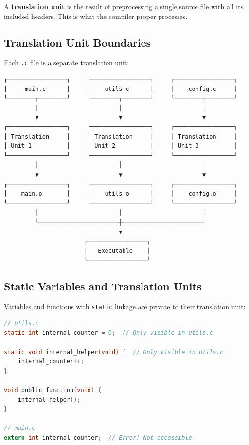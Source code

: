 A \textbf{translation unit} is the result of preprocessing a single source file with all its included headers. This is what the compiler proper processes.

\subsection{Translation Unit Boundaries}

Each \texttt{.c} file is a separate translation unit:

\begin{verbatim}
┌─────────────────┐     ┌─────────────────┐     ┌─────────────────┐
│     main.c      │     │    utils.c      │     │    config.c     │
└────────┬────────┘     └────────┬────────┘     └────────┬────────┘
         │                       │                       │
         ▼                       ▼                       ▼
┌─────────────────┐     ┌─────────────────┐     ┌─────────────────┐
│ Translation     │     │ Translation     │     │ Translation     │
│ Unit 1          │     │ Unit 2          │     │ Unit 3          │
└─────────────────┘     └─────────────────┘     └─────────────────┘
         │                       │                       │
         ▼                       ▼                       ▼
┌─────────────────┐     ┌─────────────────┐     ┌─────────────────┐
│    main.o       │     │    utils.o      │     │    config.o     │
└─────────────────┘     └─────────────────┘     └─────────────────┘
         │                       │                       │
         └───────────────────────┼───────────────────────┘
                                 ▼
                       ┌─────────────────┐
                       │   Executable    │
                       └─────────────────┘
\end{verbatim}

\subsection{Static Variables and Translation Units}

Variables and functions with \texttt{static} linkage are private to their translation unit:

\begin{lstlisting}[language=C]
// utils.c
static int internal_counter = 0;  // Only visible in utils.c

static void internal_helper(void) {  // Only visible in utils.c
    internal_counter++;
}

void public_function(void) {
    internal_helper();
}

// main.c
extern int internal_counter;  // Error! Not accessible
\end{lstlisting}


